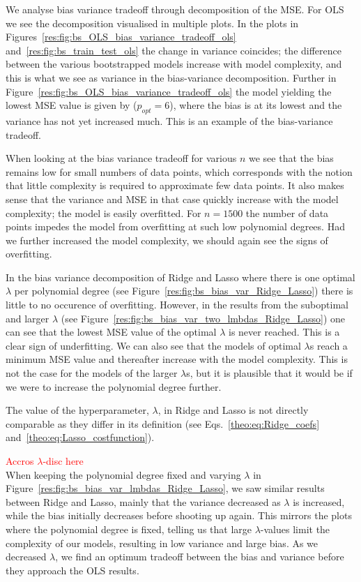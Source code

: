 \documentclass[twocolumn,english,notitlepage]{article}
\newcommand{\comment}[1]{\textcolor{red}{#1}}
\begin{document}
            We analyse bias variance tradeoff through decomposition of the MSE. For OLS we see the decomposition visualised in multiple plots. In the plots in Figures~\ref{res:fig:bs_OLS_bias_variance_tradeoff_ols} and~\ref{res:fig:bs_train_test_ols} the change in variance coincides; the difference between the various bootstrapped models increase with model complexity, and this is what we see as variance in the bias-variance decomposition. Further in Figure~\ref{res:fig:bs_OLS_bias_variance_tradeoff_ols} the model yielding the lowest MSE value is given by ($p_{opt}=6$), where the bias is at its lowest and the variance has not yet increased much. This is an example of the bias-variance tradeoff.  

            When looking at the bias variance tradeoff for various $n$ we see that the bias remains low for small numbers of data points, which corresponds with the notion that little complexity is required to approximate few data points. It also makes sense that the variance and MSE in that case quickly increase with the model complexity; the model is easily overfitted. For $n=1500$ the number of data points impedes the model from overfitting at such low polynomial degrees. Had we further increased the model complexity, we should again see the signs of overfitting. 

            In the bias variance decomposition of Ridge and Lasso where there is one optimal $\lambda$ per polynomial degree (see Figure~\ref{res:fig:bs_bias_var_Ridge_Lasso}) there is little to no occurence of overfitting. However, in the results from the suboptimal and larger $\lambda$ (see Figure~\ref{res:fig:bs_bias_var_two_lmbdas_Ridge_Lasso}) one can see that the lowest MSE value of the optimal $\lambda$ is never reached. This is a clear sign of underfitting. We can also see that the models of optimal $\lambda$s reach a minimum MSE value and thereafter increase with the model complexity. This is not the case for the models of the larger $\lambda$s, but it is plausible that it would be if we were to increase the polynomial degree further. 
            
            The value of the hyperparameter, $\lambda$, in Ridge and Lasso is not directly comparable as they differ in its definition (see Eqs.~\eqref{theo:eq:Ridge_coefs} and~\eqref{theo:eq:Lasso_costfunction}).   


            \comment{Accros $\lambda$-disc here}\\
            When keeping the polynomial degree fixed and varying $\lambda$ in Figure~\ref{res:fig:bs_bias_var_lmbdas_Ridge_Lasso}, we saw similar results between Ridge and Lasso, mainly that the variance decreased as $\lambda$ is increased, while the bias initially decreases before shooting up again. This mirrors the plots where the polynomial degree is fixed, telling us that large $\lambda$-values limit the complexity of our models, resulting in low variance and large bias. As we decreased $\lambda$, we find an optimum tradeoff between the bias and variance before they approach the OLS results.
\end{document}
